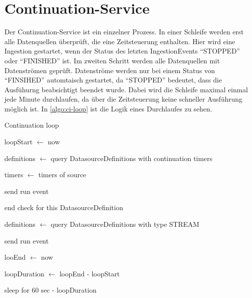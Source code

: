\section{Continuation-Service}

Der Continuation-Service ist ein einzelner Prozess.
In einer Schleife werden erst alle Datenquellen überprüft, die eine Zeitsteuerung enthalten.
Hier wird eine Ingestion gestartet, wenn der Status des letzten IngestionEvents "`STOPPED"' oder "`FINISHED"' ist.
Im zweiten Schritt werden alle Datenquellen mit Datenströmen geprüft.
Datenströme werden nur bei einem Status von "`FINSIHED"' automtaisch gestartet, da "`STOPPED"' bedeutet, dass die Ausfühurng beabsichtigt beendet wurde.
Dabei wird die Schleife maximal einmal jede Minute durchlaufen, da über die Zeitsteuerung keine schneller Ausführung möglich ist.
In \cref{algo:ci-loop} ist die Logik eines Durchlaufes zu sehen.

\begin{algorithm}
    \caption{Continuation loop}
    \label{algo:ci-loop}

    loopStart $\gets$ now \

    definitions $\gets$ query DatasourceDefinitions with continuation timers \

     {

        timers $\gets$ timers of source \

         {

             {

                 {

                    send run event \

                    end check for this DatasourceDefinition \
                }
            }
        }
    }

    definitions $\gets$ query DatasourceDefinitions with type STREAM \
     {

         {

            send run event \
        }
    }

    looEnd $\gets$ now \

    loopDuration $\gets$ loopEnd - loopStart \

     {

        sleep for 60 sec - loopDuration \
    }

\end{algorithm}

